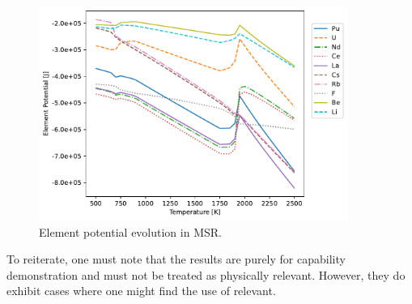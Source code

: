 \begin{figure}[ht]
         \centering
         \includegraphics[width=0.9\textwidth]{figures/chapter-7/msr_ep.pdf}
         \caption{Element potential evolution in MSR.}
         \label{fig:res_epmsr}
 \end{figure}
To reiterate, one must note that the results are purely for capability demonstration and must not be treated as physically relevant. However, they do exhibit cases where one might find the use of {\GEM} relevant.
 
